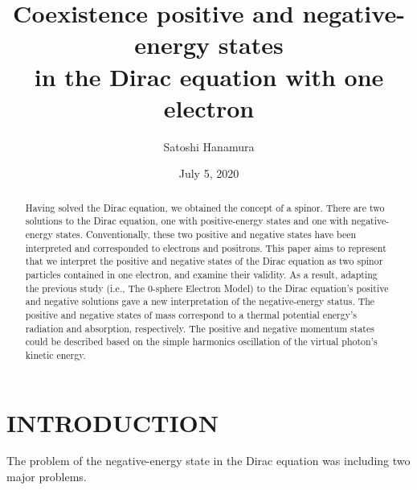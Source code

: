 \documentclass[%
 reprint,
 amsmath,amssymb,
 aps,
]{revtex4-1}
\numberwithin{equation}{section}%
\begin{document}


    \title{Coexistence positive and negative-energy states \\ in the Dirac equation with one electron}
    \author{Satoshi Hanamura}
    \date{July 5, 2020}
        \begin{abstract}

    Having solved the Dirac equation, we obtained the concept of a spinor. There are two solutions to the Dirac equation, one with positive-energy states and one with negative-energy states. Conventionally, these two positive and negative states have been interpreted and corresponded to electrons and positrons. This paper aims to represent that we interpret the positive and negative states of the Dirac equation as two spinor particles contained in one electron, and examine their validity. As a result, adapting the previous study (i.e., The 0-sphere Electron Model) to the Dirac equation's positive and negative solutions gave a new interpretation of the negative-energy status. The positive and negative states of mass correspond to a thermal potential energy's radiation and absorption, respectively. The positive and negative momentum states could be described based on the simple harmonics oscillation of the virtual photon's kinetic energy.


        \end{abstract}
    \maketitle


\section{\label{sec:INTRODUCTION}INTRODUCTION}


    The problem of the negative-energy state in the Dirac equation was including two major problems.
    
\end{document}
